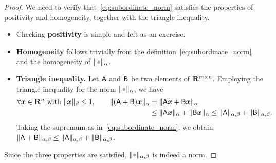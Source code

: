 \begin{proof}
    We need to verify that~\eqref{eq:subordinate_norm} satisfies the properties of positivity and homogeneity,
    together with the triangle inequality.
    \begin{itemize}
        \item
            Checking \textbf{positivity} is simple and left as an exercise.

        \item
            \textbf{Homogeneity} follows trivially from the definition~\eqref{eq:subordinate_norm}
            and the homogeneity of $\norm{\placeholder}_{\alpha}$.

        \item
            \textbf{Triangle inequality.}
            Let $\mathsf A$ and $\mathsf B$ be two elements of $\mathbf R^{m \times n}$.
            Employing the triangle inequality for the norm $\norm{\placeholder}_{\alpha}$,
            we have
            \begin{align*}
                \forall \mathbf{\boldsymbol{x}} \in \mathbf R^{n} ~ \text{with} ~ \lVert\mathbf{\boldsymbol{x}}\rVert_{\beta}\leq 1, \qquad
                \lVert(\mathsf A + \mathsf B) \mathbf{\boldsymbol{x}}\rVert_{\alpha}
                &= \lVert\mathsf A \mathbf{\boldsymbol{x}} + \mathsf B \mathbf{\boldsymbol{x}}\rVert_{\alpha} \\
                &\leq \lVert\mathsf A \mathbf{\boldsymbol{x}}\rVert_{\alpha} + \lVert\mathsf B \mathbf{\boldsymbol{x}}\rVert_{\alpha}
                \leq \lVert\mathsf A\rVert_{\alpha,\beta} + \lVert\mathsf B\rVert_{\alpha,\beta}.
            \end{align*}
            Taking the supremum as in~\eqref{eq:subordinate_norm},
            we obtain $\lVert\mathsf A + \mathsf B\rVert_{\alpha,\beta} \leq \lVert\mathsf A\rVert_{\alpha,\beta} + \lVert\mathsf B\rVert_{\alpha,\beta}$.
    \end{itemize}
    Since the three properties are satisfied, $\norm{\placeholder}_{\alpha,\beta}$ is indeed a norm.
\end{proof}

